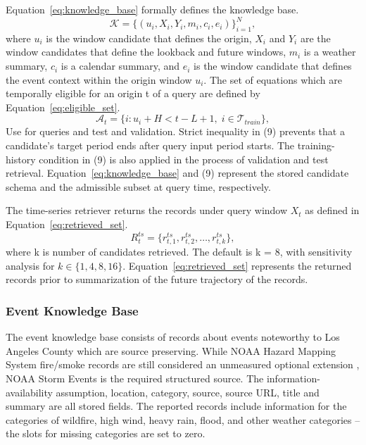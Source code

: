 \documentclass{ieeeaccess}
\begin{document}
Equation~\eqref{eq:knowledge_base} formally defines the knowledge base.
\begin{equation}
    \mathcal{K} = \{(u_i, X_i, Y_i, m_i, c_i, e_i)\}_{i=1}^{N},
    \label{eq:knowledge_base}
\end{equation}
where $u_{i}$ is the window candidate that defines the origin, $X_{i}$ and $Y_{i}$ are the window candidates that define the lookback and future windows, $m_{i}$ is a weather summary, $c_{i}$ is a calendar summary, and $e_{i}$ is the window candidate that defines the event context within the origin window $u_{i}$. The set of equations which are temporally eligible for an origin t of a query are defined by Equation~\eqref{eq:eligible_set}.
\begin{equation}
    \mathcal{A}_t =
    \{i: u_i + H < t-L+1,\; i \in \mathcal{T}_{train}\},
    \label{eq:eligible_set}
\end{equation}
Use for queries and test and validation. Strict inequality in (9) prevents that a candidate's target period ends after query input period starts. The training-history condition in (9) is also applied in the process of validation and test retrieval. Equation~\eqref{eq:knowledge_base} and (9) represent the stored candidate schema and the admissible subset at query time, respectively.

The time-series retriever returns the records under query window $X_{t}$ as defined in Equation~\eqref{eq:retrieved_set}.
\begin{equation}
    R^{ts}_t = \{r^{ts}_{t,1}, r^{ts}_{t,2}, \ldots, r^{ts}_{t,k}\},
    \label{eq:retrieved_set}
\end{equation}
where k is number of candidates retrieved. The default is k = 8, with sensitivity analysis for $k \in \{1, 4, 8, 16\}$. Equation~\eqref{eq:retrieved_set} represents the returned records prior to summarization of the future trajectory of the records.

\subsubsection{Event Knowledge Base}
The event knowledge base consists of records about events noteworthy to Los Angeles County which are source preserving. While NOAA Hazard Mapping System fire/smoke records are still considered an unmeasured optional extension \cite{noaastormevents2026,noaahms2026}, NOAA Storm Events is the required structured source. The information-availability assumption, location, category, source, source URL, title and summary are all stored fields. The reported records include information for the categories of wildfire, high wind, heavy rain, flood, and other weather categories -- the slots for missing categories are set to zero.
\end{document}
